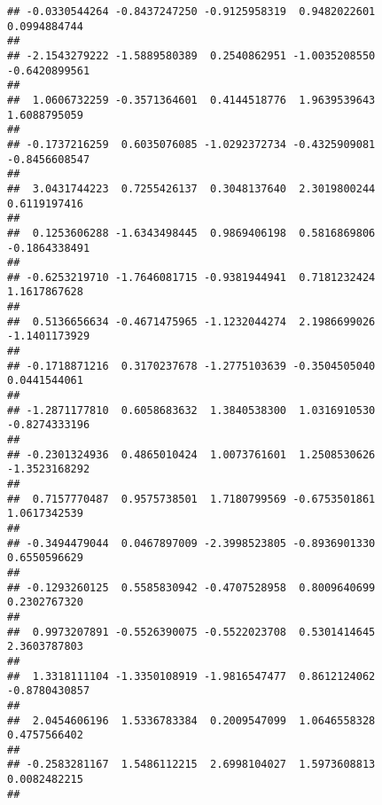 \documentclass[]{article}
\begin{document}
\begin{verbatim}
## -0.0330544264 -0.8437247250 -0.9125958319  0.9482022601  0.0994884744 
##                                                                       
## -2.1543279222 -1.5889580389  0.2540862951 -1.0035208550 -0.6420899561 
##                                                                       
##  1.0606732259 -0.3571364601  0.4144518776  1.9639539643  1.6088795059 
##                                                                       
## -0.1737216259  0.6035076085 -1.0292372734 -0.4325909081 -0.8456608547 
##                                                                       
##  3.0431744223  0.7255426137  0.3048137640  2.3019800244  0.6119197416 
##                                                                       
##  0.1253606288 -1.6343498445  0.9869406198  0.5816869806 -0.1864338491 
##                                                                       
## -0.6253219710 -1.7646081715 -0.9381944941  0.7181232424  1.1617867628 
##                                                                       
##  0.5136656634 -0.4671475965 -1.1232044274  2.1986699026 -1.1401173929 
##                                                                       
## -0.1718871216  0.3170237678 -1.2775103639 -0.3504505040  0.0441544061 
##                                                                       
## -1.2871177810  0.6058683632  1.3840538300  1.0316910530 -0.8274333196 
##                                                                       
## -0.2301324936  0.4865010424  1.0073761601  1.2508530626 -1.3523168292 
##                                                                       
##  0.7157770487  0.9575738501  1.7180799569 -0.6753501861  1.0617342539 
##                                                                       
## -0.3494479044  0.0467897009 -2.3998523805 -0.8936901330  0.6550596629 
##                                                                       
## -0.1293260125  0.5585830942 -0.4707528958  0.8009640699  0.2302767320 
##                                                                       
##  0.9973207891 -0.5526390075 -0.5522023708  0.5301414645  2.3603787803 
##                                                                       
##  1.3318111104 -1.3350108919 -1.9816547477  0.8612124062 -0.8780430857 
##                                                                       
##  2.0454606196  1.5336783384  0.2009547099  1.0646558328  0.4757566402 
##                                                                       
## -0.2583281167  1.5486112215  2.6998104027  1.5973608813  0.0082482215 
##                                                                       

\end{verbatim}
\end{document}
